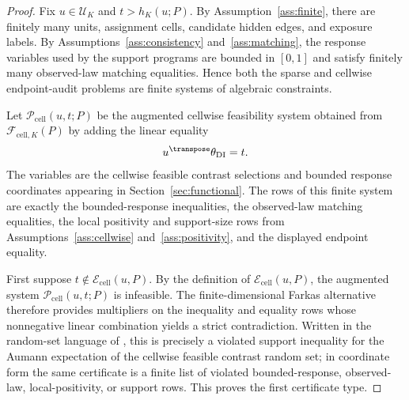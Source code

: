 \begin{proof}
Fix \(u\in\mathcal U_K\) and \(t>h_K(u;P)\).  By Assumption~\ref{ass:finite}, there are finitely many units, assignment cells, candidate hidden edges, and exposure labels.  By Assumptions~\ref{ass:consistency} and~\ref{ass:matching}, the response variables used by the support programs are bounded in \([0,1]\) and satisfy finitely many observed-law matching equalities.  Hence both the sparse and cellwise endpoint-audit problems are finite systems of algebraic constraints.

Let \(\mathcal P_{\mathrm{cell}}(u,t;P)\) be the augmented cellwise feasibility system obtained from \(\mathcal F_{\mathrm{cell},K}(P)\) by adding the linear equality
\[
u^\transpose\theta_{\mathrm{DI}}=t.
\]
The variables are the cellwise feasible contrast selections and bounded response coordinates appearing in Section~\ref{sec:functional}.  The rows of this finite system are exactly the bounded-response inequalities, the observed-law matching equalities, the local positivity and support-size rows from Assumptions~\ref{ass:cellwise} and~\ref{ass:positivity}, and the displayed endpoint equality.

First suppose \(t\notin\mathcal E_{\mathrm{cell}}(u,P)\).  By the definition of \(\mathcal E_{\mathrm{cell}}(u,P)\), the augmented system \(\mathcal P_{\mathrm{cell}}(u,t;P)\) is infeasible.  The finite-dimensional Farkas alternative therefore provides multipliers on the inequality and equality rows whose nonnegative linear combination yields a strict contradiction.  Written in the random-set language of \cite{BeresteanuMolchanovMolinari2011}, this is precisely a violated support inequality for the Aumann expectation of the cellwise feasible contrast random set; in coordinate form the same certificate is a finite list of violated bounded-response, observed-law, local-positivity, or support rows.  This proves the first certificate type.


\end{proof}
